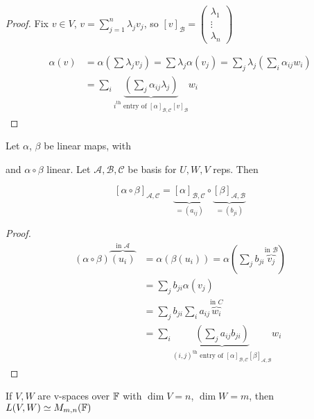 \documentclass[a4paper]{article}
\begin{document}
\begin{proof} Fix $ v \in V $, $ v = \sum_{j=1}^{n} \lambda_{j}v_{j} $, so $ [v]_{\mathcal{B}} = \begin{pmatrix}
	\lambda_{1} \\
	\vdots \\
	\lambda_{n}
	\end{pmatrix} $
	
	
	\begin{align*}
	\alpha(v) & = \alpha( \sum \lambda_{j} v_{j} )  = \sum \lambda_{j} \alpha(v_{j}) = \sum_{j} \lambda_{j} (\sum_{i} \alpha_{ij} w_{i}  )  \\
	& = \sum_{i} \underbrace{\left(  \sum_{j} \alpha_{ij} \lambda_{j}  \right)}_{i^{\text{th}} \text{ entry of } [\alpha]_{\mathcal{B},\mathcal{C}} [v]_{\mathcal{B}}  } w_{i}
	\end{align*}
	
\end{proof}

\begin{lemma} 
	Let $ \alpha $, $ \beta $ be linear maps, with
	and $ \alpha \circ \beta $ linear. Let $ \mathcal{A},\mathcal{B},\mathcal{C} $ be basis for $ U,W,V $ reps. Then
	
	\[  [\alpha \circ \beta]_{\mathcal{A},\mathcal{C}} = \underbrace{[\alpha]_{\mathcal{B},\mathcal{C}}}_{= (a_{ij})} \circ \underbrace{[\beta]_{\mathcal{A},\mathcal{B}}}_{= (b_{ji})}\]

\end{lemma}

\begin{proof}
	\begin{align*}
	(\alpha \circ \beta) \overbrace{(u_{i}) }^{\text{in } \mathcal{A}} & = \alpha(\beta(u_{i})) = \alpha (\sum_{j} b_{ji}\overbrace{ v_{j}}^{\text{in } \mathcal{B}} ) \\
	& = \sum_{j} b_{ji} \alpha(v_{j})\\
	& = \sum_{j} b_{ji} \sum_{i} a_{ij} \overbrace{w_{i}}^{\text{in } C} \\
	& = \sum_{i} \underbrace{\left(  \sum_{j} a_{ij} b_{ji} \right)}_{(i,j)^{\text{th}} \text{ entry of } [\alpha]_{\mathcal{B},\mathcal{C}} [\beta]_{\mathcal{A},\mathcal{B}}  }    w_{i} 
	\end{align*}
\end{proof}


\begin{prop} 
	If $ V,W $ are v-spaces over $ \mathbb{F} $ with $ \dim V = n $, $ \dim W = m $, then $ L(V,W) \simeq M_{m,n}(\mathbb{F})  $
\end{prop}
\end{document}
